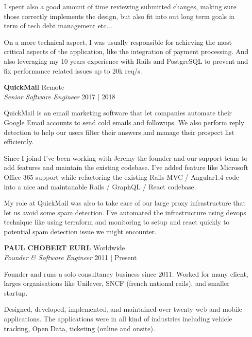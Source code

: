 \documentclass[a4paper]{article}
\begin{document}
I spent also a good amount of time reviewing submitted changes, making sure those correctly implements
the design, but also fit into out long term goals in term of tech debt management etc...

On a more technical aspect, I was usually responsible for achieving the most critical aspects of the application,
like the integration of payment processing. And also leveraging my 10 years experience with Rails and PostgreSQL
to prevent and fix performance related issues up to 20k req/s.

\textbf{QuickMail} \hfill Remote\\
\textit{Senior Software Engineer} \hfill 2017 | 2018\\
\vspace{2mm}

QuickMail is an email marketing software that let companies automate their Google Email accounts to send cold emails and followups.
We also perform reply detection to help our users filter their answers and manage their prospect list efficiently.

Since I joind I've been working with Jeremy the founder and our support team
to add features and maintain the existing codebase.
I've added feature like Microsoft Office 365 support while refactoring the existing
Rails MVC / Angular1.4 code into a nice and maintanable Rails / GraphQL / React codebase.

My role at QuickMail was also to take care of our large proxy infrastructure that let us avoid some spam detection.
I've automated the infrastructure using devops technique like using terraform and monitoring to setup and react quickly
to potential spam detection issue we might encounter.

\vspace{2mm}

\textbf{PAUL CHOBERT EURL} \hfill Worldwide\\
\textit{Founder \& Software Engineer} \hfill 2011 | Present\\
\vspace{2mm}

Founder and runs a solo consultancy business since 2011. Worked for many client, larges organisations like Unilever, SNCF (french national rails), and smaller startup.

Designed, developed, implemented, and maintained over twenty web and mobile applications.
The applications were in all kind of industries including vehicle tracking, Open Data, ticketing (online and onsite).
\end{document}
